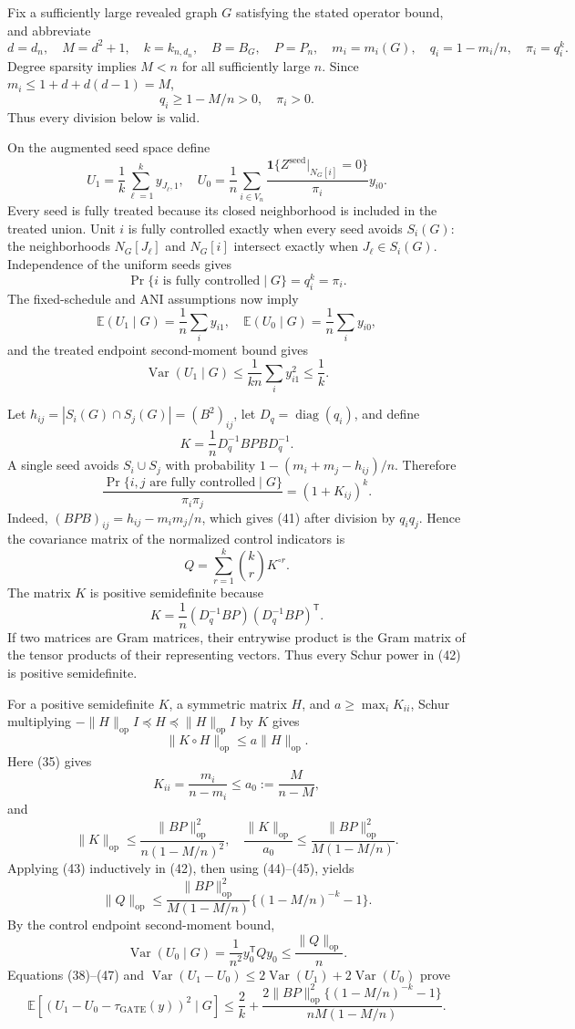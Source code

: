 Fix a sufficiently large revealed graph \(G\) satisfying the stated
operator bound, and abbreviate
\[
d=d_n,\quad M=d^2+1,\quad k=k_{n,d_n},\quad B=B_G,\quad P=P_n,
\quad m_i=m_i(G),\quad q_i=1-m_i/n,\quad \pi_i=q_i^k.
\]
Degree sparsity implies \(M<n\) for all sufficiently large \(n\).  Since
\(m_i\le1+d+d(d-1)=M\),
\[
q_i\ge1-M/n>0,\quad \pi_i>0.
\tag{35}
\]
Thus every division below is valid.

On the augmented seed space define
\[
U_1=\frac1k\sum_{\ell=1}^k y_{J_\ell,1},\quad
U_0=\frac1n\sum_{i\in V_n}
\frac{\mathbf1\{Z^{\mathrm{seed}}|_{N_G[i]}=0\}}{\pi_i}y_{i0}.
\tag{36}
\]
Every seed is fully treated because its closed neighborhood is included in
the treated union.  Unit \(i\) is fully controlled exactly when every seed
avoids \(S_i(G)\): the neighborhoods \(N_G[J_\ell]\) and \(N_G[i]\)
intersect exactly when \(J_\ell\in S_i(G)\).  Independence of the uniform
seeds gives
\[
\Pr\{i\text{ is fully controlled}\mid G\}=q_i^k=\pi_i.
\tag{37}
\]
The fixed-schedule and ANI assumptions now imply
\[
\mathbb E(U_1\mid G)=\frac1n\sum_i y_{i1},\quad
\mathbb E(U_0\mid G)=\frac1n\sum_i y_{i0},
\tag{38}
\]
and the treated endpoint second-moment bound gives
\[
\operatorname{Var}(U_1\mid G)
\le\frac1{kn}\sum_i y_{i1}^2\le\frac1k.
\tag{39}
\]

Let \(h_{ij}=|S_i(G)\cap S_j(G)|=(B^2)_{ij}\), let
\(D_q=\operatorname{diag}(q_i)\), and define
\[
K=\frac1nD_q^{-1}BPB D_q^{-1}.
\tag{40}
\]
A single seed avoids \(S_i\cup S_j\) with probability
\(1-(m_i+m_j-h_{ij})/n\).  Therefore
\[
\frac{\Pr\{i,j\text{ are fully controlled}\mid G\}}{\pi_i\pi_j}
=\left(1+K_{ij}\right)^k.
\tag{41}
\]
Indeed, \((BPB)_{ij}=h_{ij}-m_im_j/n\), which gives (41) after division by
\(q_iq_j\).  Hence the covariance matrix of the normalized control
indicators is
\[
Q=\sum_{r=1}^k{k\choose r}K^{\circ r}.
\tag{42}
\]
The matrix \(K\) is positive semidefinite because
\[
K=\frac1n(D_q^{-1}BP)(D_q^{-1}BP)^{\mathsf T}.
\]
If two matrices are Gram matrices, their entrywise product is the Gram
matrix of the tensor products of their representing vectors.  Thus every
Schur power in (42) is positive semidefinite.

For a positive semidefinite \(K\), a symmetric matrix \(H\), and
\(a\ge\max_iK_{ii}\), Schur multiplying
\(-\|H\|_{\mathrm{op}}I\preceq H\preceq\|H\|_{\mathrm{op}}I\) by \(K\)
gives
\[
\|K\circ H\|_{\mathrm{op}}\le a\|H\|_{\mathrm{op}}.
\tag{43}
\]
Here (35) gives
\[
K_{ii}=\frac{m_i}{n-m_i}\le a_0:=\frac{M}{n-M},
\tag{44}
\]
and
\[
\|K\|_{\mathrm{op}}
\le\frac{\|BP\|_{\mathrm{op}}^2}{n(1-M/n)^2},\quad
\frac{\|K\|_{\mathrm{op}}}{a_0}
\le\frac{\|BP\|_{\mathrm{op}}^2}{M(1-M/n)}.
\tag{45}
\]
Applying (43) inductively in (42), then using (44)--(45), yields
\[
\|Q\|_{\mathrm{op}}
\le\frac{\|BP\|_{\mathrm{op}}^2}{M(1-M/n)}
\{(1-M/n)^{-k}-1\}.
\tag{46}
\]
By the control endpoint second-moment bound,
\[
\operatorname{Var}(U_0\mid G)
=\frac1{n^2}y_0^{\mathsf T}Qy_0
\le\frac{\|Q\|_{\mathrm{op}}}{n}.
\tag{47}
\]
Equations (38)--(47) and
\(\operatorname{Var}(U_1-U_0)\le2\operatorname{Var}(U_1)+
2\operatorname{Var}(U_0)\) prove
\[
\mathbb E[(U_1-U_0-\tau_{\mathrm{GATE}}(y))^2\mid G]
\le \frac2k+
\frac{2\|BP\|_{\mathrm{op}}^2\{(1-M/n)^{-k}-1\}}
{nM(1-M/n)}.
\tag{48}
\]

